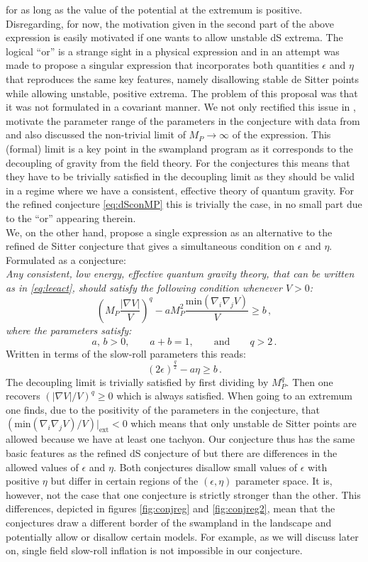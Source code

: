 \documentclass[12pt]{report}
\newcommand{\be}{\begin{equation}}
\newcommand{\ee}{\end{equation}}
\begin{document}
for as long as the value of the potential at the extremum is positive. Disregarding, for now, the motivation given in \cite{Ooguri:2018wrx} the second part of the above expression is easily motivated if one wants to allow unstable dS extrema. The logical ``or'' is a strange sight in a physical expression and in \cite{Andriot:2018wzk} an attempt was made to propose a singular expression that incorporates both quantities $\epsilon$ and $\eta$ that reproduces the same key features, namely disallowing stable de Sitter points while allowing unstable, positive extrema. The problem of this proposal was that it was not formulated in a covariant manner. We not only rectified this issue in \cite{Andriot:2018mav}, motivate the parameter range of the parameters in the conjecture with data from \cite{Roupec:2018mbn} and also discussed the non-trivial limit of $M_P \to \infty$ of the expression. This (formal) limit is a key point in the swampland program as it corresponds to the decoupling of gravity from the field theory. For the conjectures this means that they have to be trivially satisfied in the decoupling limit as they should be valid in a regime where we have a consistent, effective theory of quantum gravity. For the refined conjecture \eqref{eq:dSconMP} this is trivially the case, in no small part due to the ``or'' appearing therein.\\
We, on the other hand, propose a single expression as an alternative to the refined de Sitter conjecture that gives a simultaneous condition on $\epsilon$ and $\eta$. Formulated as a conjecture:\\
\emph{Any consistent, low energy, effective quantum gravity theory, that can be written as in \eqref{eq:leeact}, should satisfy the following condition whenever $V>0$:}
\be 
\left(M_P \frac{|\nabla V|}{V}\right)^ q - a M_P^2 \frac{\text{min}(\nabla_i \nabla_j V)}{V} \geq b\,,
\label{eq:ourdScon}
\ee
\emph{where the parameters satisfy:}
\be 
a,\, b > 0,\qquad a+b = 1, \qquad \text{and}\qquad q>2\,.
\ee
Written in terms of the slow-roll parameters this reads:
\be 
(2\epsilon)^ {\frac{q}{2}} - a \eta \geq b\,.
\label{eq:ourdSconslowroll}
\ee
The decoupling limit is trivially satisfied by first dividing by $M_P^q$. Then one recovers $(|\nabla V|/V)^q \geq 0$ which is always satisfied. When going to an extremum one finds, due to the positivity of the parameters in the conjecture, that $(\text{min}(\nabla_i \nabla_j V)/V)|_{\text{ext}}<0$ which means that only unstable de Sitter points are allowed because we have at least one tachyon. Our conjecture thus has the same basic features as the refined dS conjecture of \cite{Ooguri:2018wrx} but there are differences in the allowed values of $\epsilon$ and $\eta$. Both conjectures disallow small values of $\epsilon$ with positive $\eta$ but differ in certain regions of the $(\epsilon,\eta)$ parameter space. It is, however, not the case that one conjecture is strictly stronger than the other. This differences, depicted in figures \ref{fig:conjreg} and \ref{fig:conjreg2}, mean that the conjectures draw a different border of the swampland in the landscape and potentially allow or disallow certain models. For example, as we will discuss later on, single field slow-roll inflation is not impossible in our conjecture.
\end{document}
